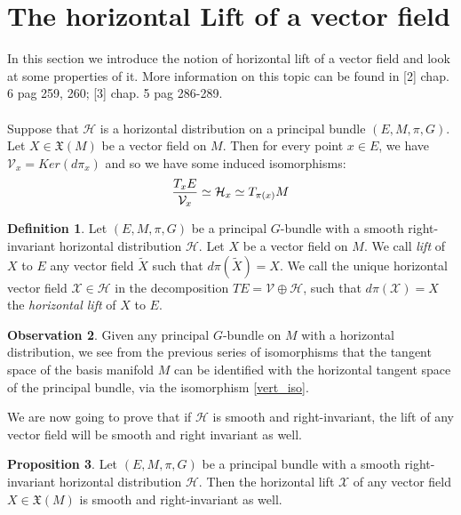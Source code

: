 \documentclass[12pt,a4paper]{report}
\theoremstyle{definition}
\newtheorem{Def}{Definition}[chapter]
\theoremstyle{Theorem}
\newtheorem{Prop}[Def]{Proposition}
\theoremstyle{definition}
\theoremstyle{definition}
\newtheorem{Obs}[Def]{Observation}
\begin{document}
	\section{The horizontal Lift of a vector field}
	In this section we introduce the notion of horizontal lift of a vector field and look at some properties of it. More information on this topic can be found in [2] chap. 6 pag 259, 260; [3] chap. 5 pag 286-289.\\
	\\
	Suppose that $\mathcal{H}$ is a horizontal distribution on a principal bundle $(E,M,\pi,G)$. Let $X\in\mathfrak{X}(M)$ be a vector field on $M$. Then for every point $x\in E$, we have $\mathcal{V}_{x}=Ker(d\pi_{x})$ and so we have some induced isomorphisms:
	\begin{equation}\label{vert_iso}
		{T_{x}E\over \mathcal{V}_{x}}\simeq \mathcal{H}_{x}\simeq T_{\pi(x)}M
	\end{equation}
	\begin{Def}
		Let $(E,M,\pi,G)$ be a principal $G$-bundle with a smooth right-invariant horizontal distribution $\mathcal{H}$. Let $X$ be a vector field on $M$. We call \textit{lift} of $X$ to $E$ any vector field $\tilde{X}$ such that $d\pi(\tilde{X})=X$. We call the unique horizontal vector field $\mathcal{X}\in \mathcal{H}$ in the decomposition $TE=\mathcal{V}\oplus\mathcal{H}$, such that $d\pi(\mathcal{X})=X$ the \textit{horizontal lift} of $X$ to $E$.
	\end{Def}
	\begin{Obs}
		Given any principal $G$-bundle on $M$ with a horizontal distribution, we see from the previous series of isomorphisms that the tangent space of the basis manifold $M$ can be identified with the horizontal tangent space of the principal bundle, via the isomorphism \ref{vert_iso}.
	\end{Obs}
	We are now going to prove that if $\mathcal{H}$ is smooth and right-invariant, the lift of any vector field will be smooth and right invariant as well.
	\begin{Prop}
		Let $(E,M,\pi,G)$ be a principal bundle with a smooth right-invariant horizontal distribution $\mathcal{H}$. Then the horizontal lift $\mathcal{X}$ of any vector field $X\in\mathfrak{X}(M)$ is smooth and right-invariant as well.
	\end{Prop}
\end{document}
